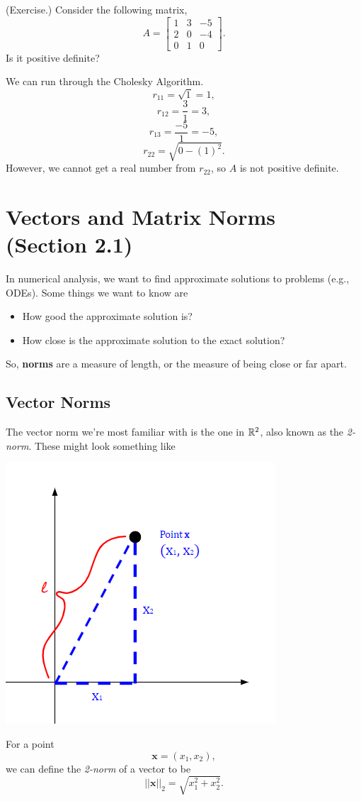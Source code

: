 \documentclass[letterpaper]{article}
\newcommand{\0}{\mathbf{0}}
\newcommand{\x}{\mathbf{x}}
\begin{document}
\begin{mdframed}
    (Exercise.) Consider the following matrix, 
    \[A = \begin{bmatrix}
        1 & 3 & -5 \\ 
        2 & 0 & -4 \\ 
        0 & 1 & 0
    \end{bmatrix}.\] Is it positive definite? 

    \begin{mdframed}
        We can run through the Cholesky Algorithm. 
        \[r_{11} = \sqrt{1} = 1,\]
        \[r_{12} = \frac{3}{1} = 3,\]
        \[r_{13} = \frac{-5}{1} = -5,\]
        \[r_{22} = \sqrt{0 - (1)^2}.\]
        However, we cannot get a real number from $r_{22}$, so $A$ is not positive definite. 
    \end{mdframed}
\end{mdframed}


\section{Vectors and Matrix Norms (Section 2.1)}
In numerical analysis, we want to find approximate solutions to problems (e.g., ODEs). Some things we want to know are 
\begin{itemize}
    \item How good the approximate solution is? 
    \item How close is the approximate solution to the exact solution? 
\end{itemize}
So, \textbf{norms} are a measure of length, or the measure of being close or far apart. 

\subsection{Vector Norms}
The vector norm we're most familiar with is the one in $\mathbb{R}^2$, also known as the \emph{2-norm}. These might look something like
\begin{center}
    \includegraphics[scale=0.9]{assets/v_norm.png}
\end{center}
For a point \[\x = (x_1, x_2),\] we can define the \emph{2-norm} of a vector to be \[||\x||_2 = \sqrt{x_{1}^{2} + x_{2}^{2}}.\]
\end{document}
